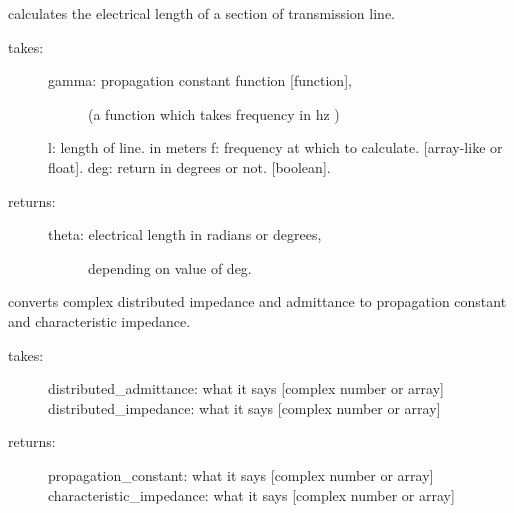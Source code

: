 \documentclass[letterpaper,10pt,english]{sphinxmanual}
\begin{document}
\begin{fulllineitems}
\label{api/mwavepy:mwavepy.tlineFunctions.distance_2_electrical_length}
calculates the electrical length of a section of transmission line.
\begin{description}
\item[{takes:}] \leavevmode\begin{description}
\item[{gamma: propagation constant function {[}function{]}, }] \leavevmode
(a function which takes frequency in hz )

\end{description}

l: length of line. in meters
f: frequency at which to calculate. {[}array-like or float{]}. 
deg: return in degrees or not. {[}boolean{]}.

\item[{returns:}] \leavevmode\begin{description}
\item[{theta: electrical length in radians or degrees, }] \leavevmode
depending on  value of deg.

\end{description}

\end{description}

\end{fulllineitems}


\begin{fulllineitems}
\label{api/mwavepy:mwavepy.tlineFunctions.distributed_circuit_2_propagation_impedance}
converts complex distributed impedance and admittance to propagation 
constant and characteristic impedance.
\begin{description}
\item[{takes:}] \leavevmode
distributed\_admittance: what it says {[}complex number or array{]}
distributed\_impedance: what it says {[}complex number or array{]}

\item[{returns:}] \leavevmode
propagation\_constant: what it says {[}complex number or array{]}
characteristic\_impedance: what it says {[}complex number or array{]}

\end{description}

\end{fulllineitems}
\end{document}
